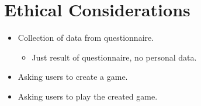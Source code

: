 \section{Ethical Considerations}
\label{Ethical_Considerations}
\begin{itemize}
	
	\item Collection of data from questionnaire.
	\begin{itemize}
		\item Just result of questionnaire, no personal data.
	\end{itemize}
	
	\item Asking users to create a game.
	\item Asking users to play the created game.
\end{itemize}
